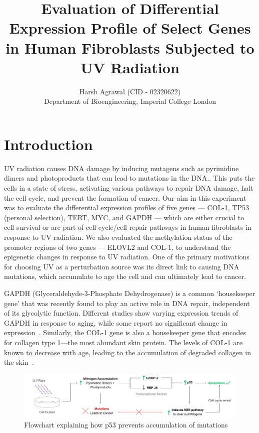 \documentclass[letterpaper,11pt]{article}
\begin{document}
\title{\vspace{-2em}Evaluation of Differential Expression Profile of Select Genes in Human Fibroblasts Subjected to UV Radiation}
\author{Harsh Agrawal (CID - 02320622) \\ Department of Bioengineering, Imperial College London}
\date{}
\maketitle
\vspace{-2em}
\section{Introduction}
UV radiation causes DNA damage by inducing mutagens such as pyrimidine dimers and photoproducts that can lead to mutations in the DNA.\cite{ref:uv_induced_aging_tp53}. This puts the cells in a state of stress, activating various pathways to repair DNA damage, halt the cell cycle, and prevent the formation of cancer. Our aim in this experiment was to evaluate the differential expression profiles of five genes — COL-1, TP53 (personal selection), TERT, MYC, and GAPDH — which are either crucial to cell survival or are part of cell cycle/cell repair pathways in human fibroblasts in response to UV radiation. We also evaluated the methylation status of the promoter regions of two genes — ELOVL2 and COL-1, to understand the epigenetic changes in response to UV radiation. One of the primary motivations for choosing UV as a perturbation source was its direct link to causing DNA mutations, which accumulate to age the cell and can ultimately lead to cancer.

GAPDH (Glyceraldehyde-3-Phosphate Dehydrogenase) is a common `housekeeper gene' that was recently found to play an active role in DNA repair, independent of its glycolytic function. Different studies show varying expression trends of GAPDH in response to aging, while some report no significant change in expression~\cite{ref:gapdh}. Similarly, the COL-1 gene is also a housekeeper gene that encodes for collagen type 1—the most abundant skin protein. The levels of COL-1 are known to decrease with age, leading to the accumulation of degraded collagen in the skin~\cite{ref:col_1}.

\begin{figure}[!ht]
    \centering
    \includegraphics[width=\textwidth]{figures/tp53.png} %
    \caption{Flowchart explaining how p53 prevents accumulation of mutations}\label{fig:tp53}
\end{figure}
\end{document}
